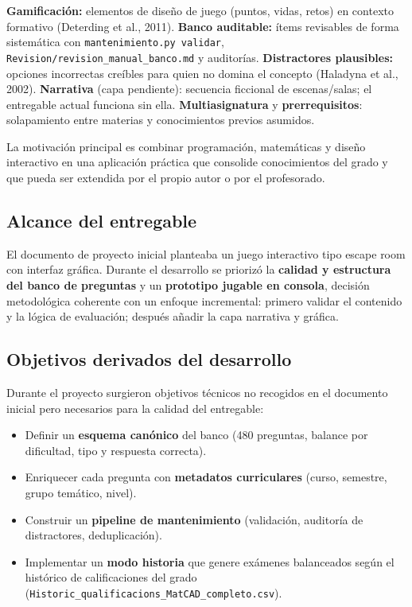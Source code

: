 \documentclass[11pt,a4paper]{article}
\begin{document}
\textbf{Gamificación:} elementos de diseño de juego (puntos, vidas, retos) en contexto formativo (Deterding et al., 2011). \textbf{Banco auditable:} ítems revisables de forma sistemática con \texttt{mantenimiento.py validar}, \texttt{Revision/revision\_manual\_banco.md} y auditorías. \textbf{Distractores plausibles:} opciones incorrectas creíbles para quien no domina el concepto (Haladyna et al., 2002). \textbf{Narrativa} (capa pendiente): secuencia ficcional de escenas/salas; el entregable actual funciona sin ella. \textbf{Multiasignatura} y \textbf{prerrequisitos}: solapamiento entre materias y conocimientos previos asumidos.

La motivación principal es combinar programación, matemáticas y diseño interactivo en una aplicación práctica que consolide conocimientos del grado y que pueda ser extendida por el propio autor o por el profesorado.

\subsection{Alcance del entregable}

El documento de proyecto inicial planteaba un juego interactivo tipo escape room con interfaz gráfica. Durante el desarrollo se priorizó la \textbf{calidad y estructura del banco de preguntas} y un \textbf{prototipo jugable en consola}, decisión metodológica coherente con un enfoque incremental: primero validar el contenido y la lógica de evaluación; después añadir la capa narrativa y gráfica.

\subsection{Objetivos derivados del desarrollo}

Durante el proyecto surgieron objetivos técnicos no recogidos en el documento inicial pero necesarios para la calidad del entregable:
\begin{itemize}
  \item Definir un \textbf{esquema canónico} del banco (480 preguntas, balance por dificultad, tipo y respuesta correcta).
  \item Enriquecer cada pregunta con \textbf{metadatos curriculares} (curso, semestre, grupo temático, nivel).
  \item Construir un \textbf{pipeline de mantenimiento} (validación, auditoría de distractores, deduplicación).
  \item Implementar un \textbf{modo historia} que genere exámenes balanceados según el histórico de calificaciones del grado (\texttt{Historic\_qualificacions\_MatCAD\_completo.csv}).
\end{itemize}
\end{document}
